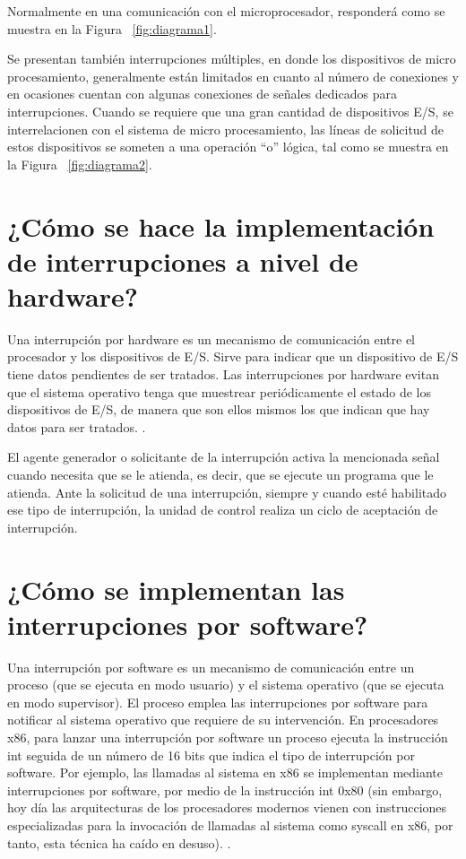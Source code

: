 \documentclass[12pt, letter]{article}
\begin{document}
\setlength{\parindent}{31pt}
Normalmente en una comunicación con el microprocesador, responderá como se muestra  en la Figura ~\ref{fig:diagrama1}.

\setlength{\parindent}{31pt}
Se presentan también interrupciones múltiples, en donde los dispositivos de micro procesamiento, generalmente están limitados en cuanto al número de conexiones y en ocasiones cuentan con algunas conexiones de señales dedicados para interrupciones. Cuando se requiere que una gran cantidad de dispositivos E/S, se interrelacionen con el sistema de micro procesamiento, las líneas de solicitud de estos dispositivos se someten a una operación “o” lógica, tal como se muestra en la Figura ~\ref{fig:diagrama2}.

\section*{¿Cómo se hace la implementación de interrupciones a nivel de hardware?}

\setlength{\parindent}{31pt}
Una interrupción por hardware es un mecanismo de comunicación entre el procesador y los dispositivos de E/S. Sirve para indicar que un dispositivo de E/S tiene datos pendientes de ser tratados. Las interrupciones por hardware evitan que el sistema operativo tenga que muestrear periódicamente el estado de los dispositivos de E/S, de manera que son ellos mismos los que indican que hay datos para ser tratados. \parencite{Int_Ex}.

\setlength{\parindent}{31pt}
 El agente generador o solicitante de la interrupción activa la mencionada señal cuando necesita que se le atienda, es decir, que se ejecute un programa que le atienda. \parencite{Micro} Ante la solicitud de una interrupción, siempre y cuando esté habilitado ese tipo de interrupción, la unidad de control realiza un ciclo de aceptación de interrupción. 
 
 \section*{ ¿Cómo se implementan las interrupciones por software?}

\setlength{\parindent}{31pt}
Una interrupción por software es un mecanismo de comunicación entre un proceso (que se ejecuta en modo usuario) y el sistema operativo (que se ejecuta en modo supervisor). El proceso emplea las interrupciones por software para notificar al sistema operativo que requiere de su intervención. En procesadores x86, para lanzar una interrupción por software un proceso ejecuta la instrucción int seguida de un número de 16 bits que indica el tipo de interrupción por software. Por ejemplo, las llamadas al sistema en x86 se implementan mediante interrupciones por software, por medio de la instrucción int 0x80 (sin embargo, hoy día las arquitecturas de los procesadores modernos vienen con instrucciones especializadas para la invocación de llamadas al sistema como syscall en x86, por tanto, esta técnica ha caído en desuso). \parencite{Int_Ex}.
\end{document}

